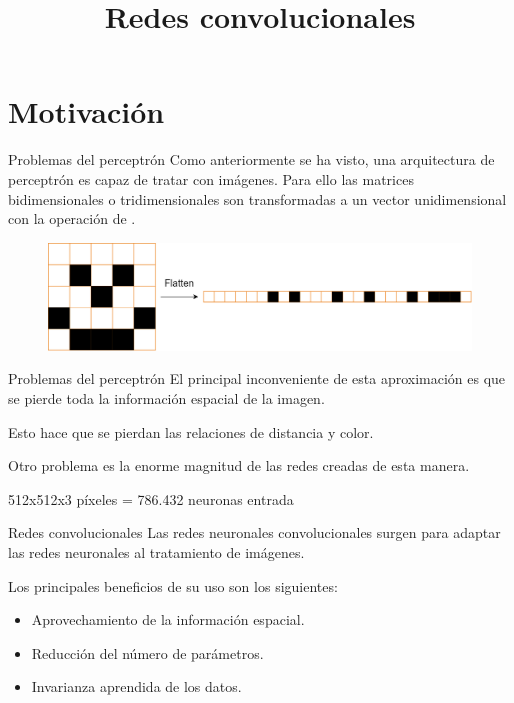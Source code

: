 



\title{Redes convolucionales}


\maketitle

\section{Motivación}

\begin{frame}{Problemas del perceptrón}
Como anteriormente se ha visto, una arquitectura de \alert{perceptrón} es capaz de tratar con imágenes. Para ello las matrices \alert{bidimensionales} o \alert{tridimensionales} son transformadas a un vector \alert{unidimensional} con la operación de .

\begin{figure}
    \centering
    \includegraphics[width=\textwidth]{figures/Tema 3/Flatten.png}
\end{figure}
\end{frame}

\begin{frame}{Problemas del perceptrón}
El principal \alert{inconveniente} de esta aproximación es que se pierde toda la información \alert{espacial} de la imagen.

Esto hace que se pierdan las \alert{relaciones} de \alert{distancia} y \alert{color}.

Otro problema es la \alert{enorme} magnitud de las redes creadas de esta manera.

\centering
{\Large 512x512x3 píxeles = 786.432 neuronas entrada}
\end{frame}

\begin{frame}{Redes convolucionales}
Las redes neuronales \alert{convolucionales} surgen para adaptar las redes neuronales al \alert{tratamiento de imágenes}.

Los principales beneficios de su uso son los siguientes:
\begin{itemize}
    \item Aprovechamiento de la información \alert{espacial}.
    \item Reducción del número de \alert{parámetros}.
    \item \alert{Invarianza} aprendida de los datos.
\end{itemize}
\end{frame}

